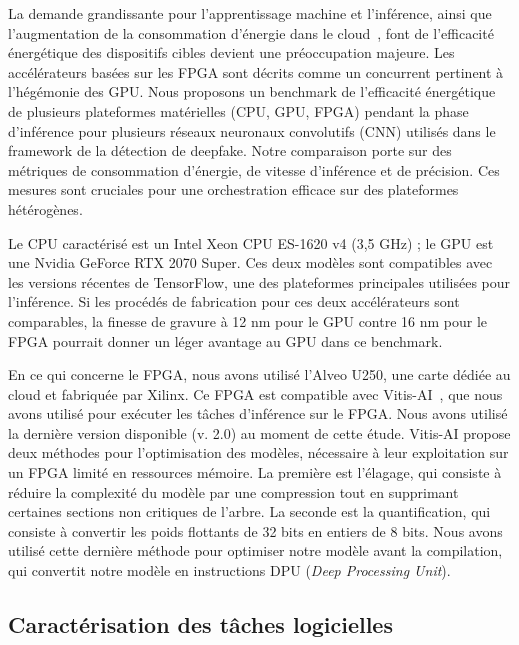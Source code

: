 La demande grandissante pour l'apprentissage machine et l'inférence, ainsi que l'augmentation de la consommation d'énergie dans le cloud~\cite{masanetRecalibratingGlobalData2020}, font de l'efficacité énergétique des dispositifs cibles devient une préoccupation majeure. Les accélérateurs basées sur les FPGA sont décrits comme un concurrent pertinent à l'hégémonie des GPU. Nous proposons un benchmark de l'efficacité énergétique de plusieurs plateformes matérielles (CPU, GPU, FPGA) pendant la phase d'inférence pour plusieurs réseaux neuronaux convolutifs (CNN) utilisés dans le framework de la détection de deepfake. Notre comparaison porte sur des métriques de consommation d'énergie, de vitesse d'inférence et de précision. Ces mesures sont cruciales pour une orchestration efficace sur des plateformes hétérogènes.

Le CPU caractérisé est un Intel Xeon CPU ES-1620 v4 (3,5 GHz) ; le GPU est une Nvidia GeForce RTX 2070 Super. Ces deux modèles sont compatibles avec les versions récentes de TensorFlow, une des plateformes principales utilisées pour l'inférence. Si les procédés de fabrication pour ces deux accélérateurs sont comparables, la finesse de gravure à 12 nm pour le GPU contre 16 nm pour le FPGA pourrait donner un léger avantage au GPU dans ce benchmark.

En ce qui concerne le FPGA, nous avons utilisé l'Alveo U250, une carte dédiée au cloud et fabriquée par Xilinx. Ce FPGA est compatible avec Vitis-AI~\cite{vitis-ai}, que nous avons utilisé pour exécuter les tâches d'inférence sur le FPGA. Nous avons utilisé la dernière version disponible (v. 2.0) au moment de cette étude. Vitis-AI propose deux méthodes pour l'optimisation des modèles, nécessaire à leur exploitation sur un FPGA limité en ressources mémoire. La première est l'élagage, qui consiste à réduire la complexité du modèle par une compression tout en supprimant certaines sections non critiques de l'arbre. La seconde est la quantification, qui consiste à convertir les poids flottants de 32 bits en entiers de 8 bits. Nous avons utilisé cette dernière méthode pour optimiser notre modèle avant la compilation, qui convertit notre modèle en instructions DPU (\textit{Deep Processing Unit}).

\subsection{Caractérisation des tâches logicielles}
\label{section:herofake-offline:workload}


